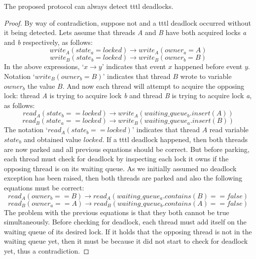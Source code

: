 \begin{Lem}
The proposed protocol can always detect \ac{tttl} deadlocks.
\end{Lem}
\begin{proof}
By way of contradiction, suppose not and a \ac{tttl} deadlock occurred without it being detected.
Lets assume that threads \emph{A} and \emph{B} have both acquired locks \emph{a} and \emph{b} respectively, as follows:
\begin{equation}
write_{A}(state_{a} = locked) \rightarrow write_{A}(owner_{a} = A)
\end{equation}
\begin{equation}
write_{B}(state_{b} = locked) \rightarrow write_{B}(owner_{b} = B)
\end{equation}
In the above expressions, `$x \rightarrow y$' indicates that event $x$ happened before event $y$. Notation `$write_{B}(owner_{b} = B)$' indicates that thread $B$ wrote to variable $owner_{b}$ the value $B$. 
And now each thread will attempt to acquire the opposing lock: thread \emph{A} is trying to acquire lock \emph{b} and thread \emph{B} is trying to acquire lock \emph{a}, as follows:
\begin{equation}
read_{A}(state_{b} == locked) \rightarrow write_{A}(waiting\_queue_{b}.insert(A))
\end{equation}
\begin{equation}
read_{B}(state_{a} == locked) \rightarrow write_{B}(waiting\_queue_{a}.insert(B))
\end{equation}
The notation `$read_{A}(state_{b} == locked)$' indicates that thread $A$ read variable $state_{b}$ and obtained value $locked$.
If a \ac{tttl} deadlock happened, then both threads are now parked and all previous equations should be correct.
But before parking, each thread must check for deadlock by inspecting each lock it owns if the opposing thread is on its waiting queue.
As we initially assumed no deadlock exception has been raised, then both threads are parked and also the following equations must be correct:
\begin{equation}
read_{A}(owner_{b} == B) \rightarrow read_{A}(waiting\_queue_{a}.contains(B) == false)
\end{equation}
\begin{equation}
read_{B}(owner_{a} == A) \rightarrow read_{B}(waiting\_queue_{b}.contains(A) == false)
\end{equation}
The problem with the previous equations is that they both cannot be true simultaneously.
Before checking for deadlock, each thread must add itself on the waiting queue of its desired lock.
If it holds that the opposing thread is not in the waiting queue yet, then it must be because it did not start to check for deadlock yet, thus a contradiction.
\end{proof}

